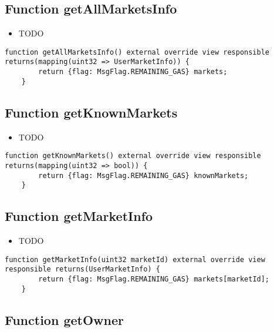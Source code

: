 \subsection{Function getAllMarketsInfo}

\noindent\begin{itemize}
\item TODO
\end{itemize}

\begin{lstlisting}[firstnumber=40]
    function getAllMarketsInfo() external override view responsible returns(mapping(uint32 => UserMarketInfo)) {
        return {flag: MsgFlag.REMAINING_GAS} markets;
    }
\end{lstlisting}

\subsection{Function getKnownMarkets}

\noindent\begin{itemize}
\item TODO
\end{itemize}

\begin{lstlisting}[firstnumber=36]
    function getKnownMarkets() external override view responsible returns(mapping(uint32 => bool)) {
        return {flag: MsgFlag.REMAINING_GAS} knownMarkets;
    }
\end{lstlisting}

\subsection{Function getMarketInfo}

\noindent\begin{itemize}
\item TODO
\end{itemize}

\begin{lstlisting}[firstnumber=44]
    function getMarketInfo(uint32 marketId) external override view responsible returns(UserMarketInfo) {
        return {flag: MsgFlag.REMAINING_GAS} markets[marketId];
    }
\end{lstlisting}

\subsection{Function getOwner}

